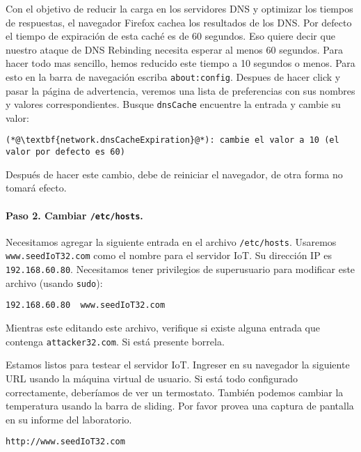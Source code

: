 Con el objetivo de reducir la carga en los servidores DNS y optimizar los tiempos de respuestas, el navegador Firefox cachea los resultados de los DNS. Por defecto el tiempo de expiración de esta caché es de 60 segundos. Eso quiere decir que nuestro ataque de DNS Rebinding necesita esperar al menos 60 segundos. Para hacer todo mas sencillo, hemos reducido este tiempo a 10 segundos o menos. Para esto en la barra de navegación escriba  \texttt{about:config}. 
Despues de hacer click y pasar la página de advertencia, veremos una lista de preferencias con sus nombres y valores correspondientes.
Busque \texttt{dnsCache} encuentre la entrada y cambie su valor:

\begin{lstlisting}
(*@\textbf{network.dnsCacheExpiration}@*): cambie el valor a 10 (el valor por defecto es 60)
\end{lstlisting}

Después de hacer este cambio, debe de reiniciar el navegador, de otra forma no tomará efecto.


\paragraph{Paso 2. Cambiar \texttt{/etc/hosts}.}
Necesitamos agregar la siguiente entrada en el archivo \texttt{/etc/hosts}. Usaremos \texttt{www.seedIoT32.com} como el nombre para el servidor IoT. Su dirección IP es \texttt{192.168.60.80}. 
Necesitamos tener privilegios de superusuario para modificar este archivo (usando \texttt{sudo}): 

\begin{lstlisting}
192.168.60.80  www.seedIoT32.com
\end{lstlisting}

Mientras este editando este archivo, verifique si existe alguna entrada que contenga \texttt{attacker32.com}. Si está presente borrela.

Estamos listos para testear el servidor IoT. Ingreser en su navegador la siguiente URL usando la máquina virtual de usuario. Si está todo configurado correctamente, deberíamos de ver un termostato. También podemos cambiar la temperatura usando la barra de sliding. Por favor provea una captura de pantalla en su informe del laboratorio.

\begin{lstlisting}
http://www.seedIoT32.com
\end{lstlisting}
 

